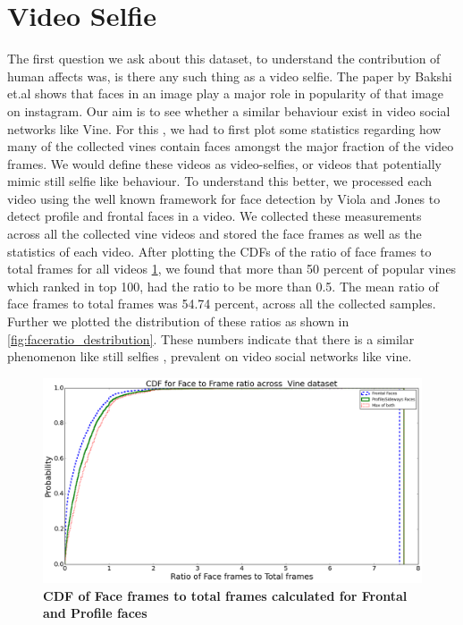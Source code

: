\section {Video Selfie}
The first question we ask about this dataset, to understand the contribution of human affects was, is there any such thing as a video selfie. The paper by Bakshi et.al \cite{Bakhshi:2014:FEU:2611105.2557403} shows that faces in an image play a major role in popularity of that image on instagram. Our aim is to see whether a similar behaviour exist in video social networks like Vine. For this , we had to first plot some statistics regarding how many of the collected vines contain faces amongst the major fraction of the video frames. We would define these videos as video-selfies, or videos that potentially mimic still selfie like behaviour. To understand this better, we processed each video using the well known framework for face detection by Viola and Jones \cite{Viola:2004:RRF:966432.966458} to detect profile and frontal faces in a video. We collected these measurements across all the collected vine videos and stored the face frames as well as the statistics of each video. After plotting the CDFs of the ratio of face frames to total frames for all videos \ref{fig:CDF_Compound}, we found that more than 50 percent of popular vines which ranked in top 100, had the ratio to be more than 0.5. The mean ratio of face frames to total frames was 54.74 percent, across all the collected samples. Further we plotted the distribution of these ratios as shown in \ref{fig:faceratio_destribution}. These numbers indicate that there is a similar phenomenon like still selfies , prevalent on video social networks like vine. 

\begin{figure}
\centering
\includegraphics[width=\columnwidth]{plots/CDF_Compound}
\caption{\textbf{CDF of Face frames to total frames calculated for Frontal and Profile faces }}
\label{fig:CDF_Compound}
\end{figure}

